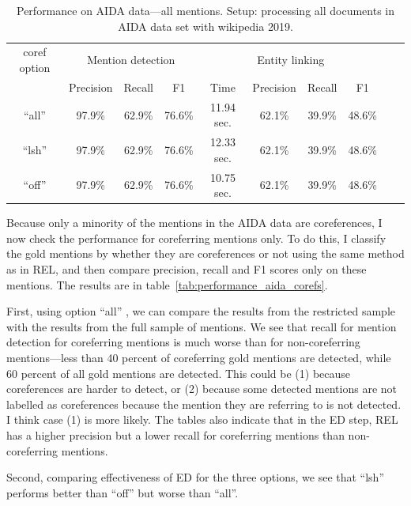\documentclass[a4paper,11pt]{article}
\numberwithin{equation}{section} %
\begin{document}
\begin{table}
 \begin{tabular}{c c c c c c c c c c}
\hline
 coref option & \multicolumn{3}{c}{Mention detection}  & \multicolumn{4}{c}{Entity linking}  \\
    \cmidrule(lr){2-4} \cmidrule(lr){5-8}
        & Precision & Recall & F1  & Time & Precision & Recall & F1 \\
 \hline 
 ``all'' & 97.9\% & 62.9\% & 76.6\% &  11.94 sec. & 62.1\% & 39.9\% & 48.6\% \\  
 ``lsh'' & 97.9\% & 62.9\% & 76.6\% &  12.33 sec. & 62.1\% & 39.9\% & 48.6\% \\
 ``off'' & 97.9\% & 62.9\% & 76.6\% &  10.75 sec.  & 62.1\% & 39.9\% & 48.6\% \\ 
\hline 
\end{tabular}
\caption{Performance on AIDA data---all mentions. Setup: processing all documents in AIDA data set with wikipedia 2019.}
\label{tab:performance_aida_full}
\end{table}


Because only a minority of the mentions in the AIDA data are coreferences, I now check the performance for coreferring mentions only. To do this, I classify the gold mentions by whether they are coreferences or not using the same method as in REL, and then compare precision, recall and F1 scores only on these mentions. The results are in table~\ref{tab:performance_aida_corefs}. 

First, using option ``all'' , we can compare the results from the restricted sample with the results from the full sample of mentions. We see that recall for mention detection for coreferring mentions is much worse than for non-coreferring mentions---less than 40 percent of coreferring gold mentions are detected, while 60 percent of all gold mentions are detected. 
This could be (1) because coreferences are harder to detect, or (2) because some detected mentions are not labelled as coreferences because the mention they are referring to is not detected. I think case (1) is more likely.
The tables also indicate that in the ED step, REL has a higher precision but a lower recall for coreferring mentions than non-coreferring mentions. 

Second, comparing effectiveness of ED for the three options, we see that ``lsh'' performs better than ``off'' but worse than ``all''. 
\end{document}
